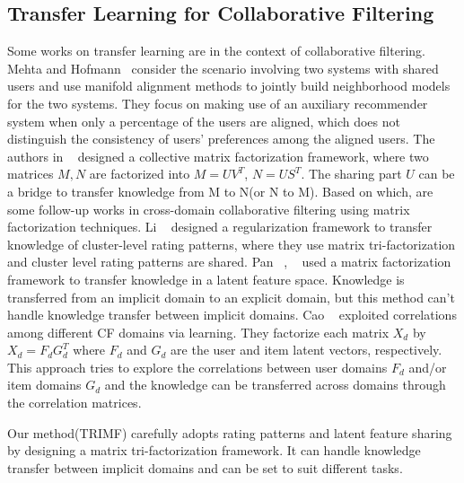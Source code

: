 \subsection{Transfer Learning for Collaborative Filtering}
Some works on transfer learning are in the context of collaborative filtering.
Mehta and Hofmann~\cite{/ki/bhaskar06cross} consider the scenario involving two systems with shared users and use manifold alignment methods to jointly build neighborhood models for the two systems. They focus on making use of an auxiliary recommender system when only a percentage of the users are aligned, which does not distinguish the consistency of users' preferences among the aligned users.
The authors in ~\cite{/kdd/SinghG08} designed a collective matrix factorization framework, where two matrices $M, N$ are factorized into $M = UV^T$, $N = US^T$. The sharing part $U$ can be a bridge to transfer knowledge from M to N(or N to M). Based on which, are some follow-up works in cross-domain collaborative filtering using matrix factorization techniques.
Li \etal~\cite{/icml/libin09} designed a regularization framework to transfer knowledge of cluster-level rating patterns, where they use matrix tri-factorization and cluster level rating patterns are shared.
Pan \etal~\cite{/ijcai/PanLXY11}, ~\cite{AAAI101649} used a matrix factorization framework to transfer knowledge in a latent feature space. Knowledge is transferred from an implicit domain to an explicit domain, but this method can’t handle knowledge transfer between implicit domains.
Cao \etal~\cite{cao2010transfer} exploited correlations among different CF domains via learning. They factorize each matrix $X_d$ by $X_d = F_d G_d^T$ where $F_d$ and $G_d$ are the user and item latent vectors, respectively. This approach tries to explore the correlations between user domains {$F_d$} and/or item domains {$G_d$} and the knowledge can be
transferred across domains through the correlation matrices.

Our method(TRIMF) carefully adopts rating patterns and latent feature sharing by designing a matrix tri-factorization framework. It can handle knowledge transfer between implicit domains and can be set to suit different tasks.

\hspace{0.05in}
